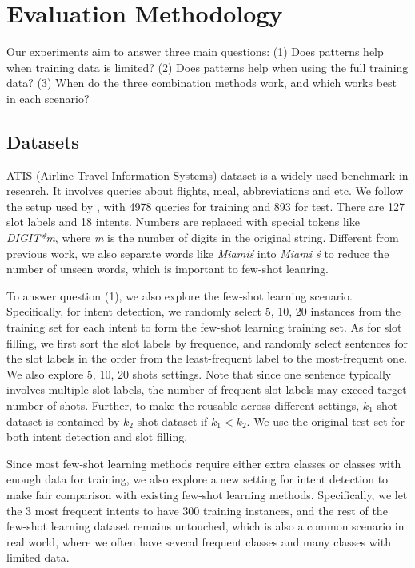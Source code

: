 \section{Evaluation Methodology}
Our experiments aim to answer three main questions: (1) Does \RE patterns help when training data is limited? (2) Does \RE patterns help when using the full training data? (3) When do the three combination methods work, and which works best in each scenario?

\subsection{Datasets}
ATIS (Airline Travel Information Systems) dataset \cite{hemphill1990atis} is a widely used benchmark in \NLU research. It involves queries about flights, meal, abbreviations and etc. We follow the setup used by \cite{liu2016attention}, with 4978 queries for training and 893 for test. There are 127 slot labels and 18 intents. Numbers are replaced with special tokens like \emph{DIGIT*m}, where \emph{m} is the number of digits in the original string. Different from previous work, we also separate words like \emph{Miami\'s} into \emph{Miami \'s} to reduce the number of unseen words, which is important to few-shot leanring.

To answer question (1), we also explore the few-shot learning scenario. Specifically, for intent detection, we randomly select 5, 10, 20 instances from the training set for each intent to form the few-shot learning training set. As for slot filling, we first sort the slot labels by frequence, and randomly select sentences for the slot labels in the order from the least-frequent label to the most-frequent one. We also explore 5, 10, 20 shots settings. Note that since one sentence typically involves multiple slot labels, the number of frequent slot labels may exceed target number of shots.
Further, to make the \RE reusable across different settings, $k_1$-shot dataset is contained by $k_2$-shot dataset if $k_1 < k_2$. 
We use the original test set for both intent detection and slot filling.

Since most few-shot learning methods require either extra classes or classes with enough data for training, we also explore a new setting for intent detection to make fair comparison with existing few-shot learning methods. Specifically, we let the 3 most frequent intents to have 300 training instances, and the rest of the few-shot learning dataset remains untouched, which is also a common scenario in real world, where we often have several frequent classes and many classes with limited data.

